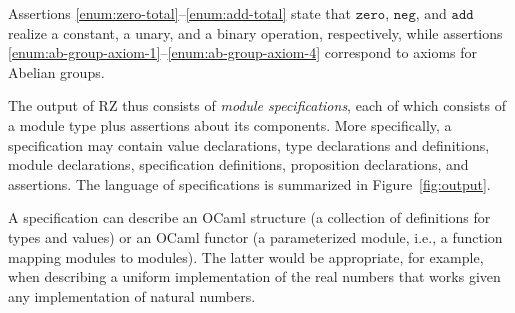 %
Assertions \ref{enum:zero-total}--\ref{enum:add-total} state that
$\mathtt{zero}$, $\mathtt{neg}$, and $\mathtt{add}$ realize a
constant, a unary, and a binary operation, respectively, while
assertions \ref{enum:ab-group-axiom-1}--\ref{enum:ab-group-axiom-4}
correspond to axioms for Abelian groups. 

The output of RZ thus consists of \emph{module specifications}, each of which consists of a module type
plus assertions about its components.  More specifically, a specification
may contain value declarations, type declarations and definitions, module
declarations, specification definitions, proposition declarations, and
assertions.  The language of specifications is summarized in
Figure~\ref{fig:output}.

A specification can describe an OCaml structure (a collection of 
definitions for types and values) or an OCaml functor (a parameterized
module, i.e., a function mapping modules to modules).  The latter would
be appropriate, for example, when describing a uniform implementation of the real numbers
that works given any implementation of natural numbers.

